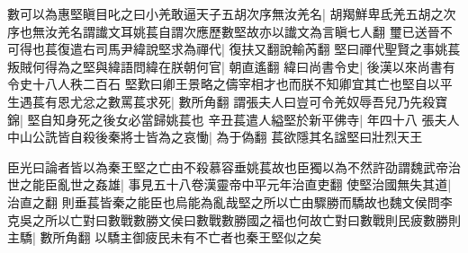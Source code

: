 數可以為惠堅瞋目叱之曰小羌敢逼天子五胡次序無汝羌名|{
	胡羯鮮卑氐羌五胡之次序也無汝羌名謂䜟文耳姚萇自謂次應歷數堅故亦以䜟文為言瞋七人翻}
璽已送晉不可得也萇復遣右司馬尹緯說堅求為禪代|{
	復扶又翻說輸芮翻}
堅曰禪代聖賢之事姚萇叛賊何得為之堅與緯語問緯在朕朝何官|{
	朝直遙翻}
緯曰尚書令史|{
	後漢以來尚書有令史十八人秩二百石}
堅歎曰卿王景略之儔宰相才也而朕不知卿宜其亡也堅自以平生遇萇有恩尤忿之數罵萇求死|{
	數所角翻}
謂張夫人曰豈可令羌奴辱吾兒乃先殺寶錦|{
	堅自知身死之後女必當歸姚萇也}
辛丑萇遣人縊堅於新平佛寺|{
	年四十八}
張夫人中山公詵皆自殺後秦將士皆為之哀慟|{
	為于偽翻}
萇欲隱其名諡堅曰壯烈天王

臣光曰論者皆以為秦王堅之亡由不殺慕容垂姚萇故也臣獨以為不然許劭謂魏武帝治世之能臣亂世之姦雄|{
	事見五十八卷漢靈帝中平元年治直吏翻}
使堅治國無失其道|{
	治直之翻}
則垂萇皆秦之能臣也烏能為亂哉堅之所以亡由驟勝而驕故也魏文侯問李克吳之所以亡對曰數戰數勝文侯曰數戰數勝國之福也何故亡對曰數戰則民疲數勝則主驕|{
	數所角翻}
以驕主御疲民未有不亡者也秦王堅似之矣

